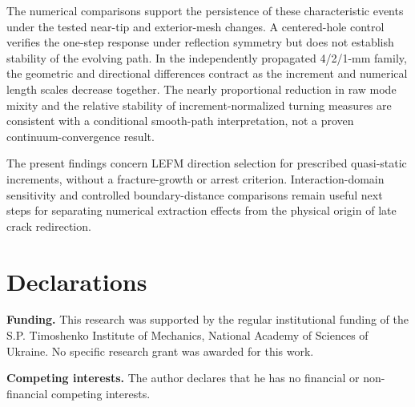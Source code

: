 \documentclass[pdflatex,sn-mathphys-num]{sn-jnl}
\begin{document}
The numerical comparisons support the persistence of
these characteristic events under the tested
near-tip and exterior-mesh changes. A centered-hole
control verifies the one-step response under reflection
symmetry but does not establish stability of the
evolving path. In the independently propagated
4/2/1-mm family, the geometric and directional
differences contract as the increment and numerical
length scales decrease together. The nearly
proportional reduction in raw mode mixity and the
relative stability of increment-normalized turning
measures are consistent with a conditional smooth-path
interpretation, not a proven continuum-convergence
result.

The present findings concern LEFM direction selection
for prescribed quasi-static increments, without a
fracture-growth or arrest criterion. Interaction-domain
sensitivity and controlled boundary-distance
comparisons remain useful next steps for separating
numerical extraction effects from the physical origin
of late crack redirection.

\FloatBarrier
\section*{Declarations}
\noindent\textbf{Funding.}
This research was supported by the regular institutional funding
of the S.P. Timoshenko Institute of Mechanics,
National Academy of Sciences of Ukraine.
No specific research grant was awarded for this work.
\par\medskip
\noindent\textbf{Competing interests.}
The author declares that he has no financial or non-financial competing interests.
\appendix
\end{document}

